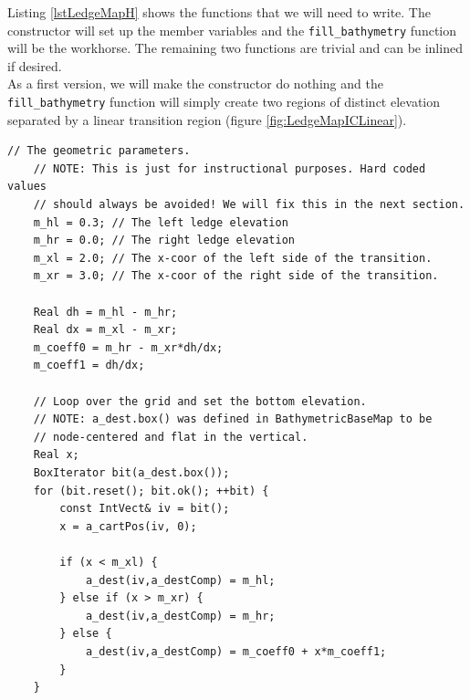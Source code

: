 \documentclass[12pt]{article}
\begin{document}
Listing \ref{lstLedgeMapH} shows the functions that we will need to write. The constructor will set up the member variables and the \texttt{fill\_bathymetry} function will be the workhorse. The remaining two functions are trivial and can be inlined if desired.\\

As a first version, we will make the constructor do nothing and the \texttt{fill\_bathymetry} function will simply create two regions of distinct elevation separated by a linear transition region (figure \ref{fig:LedgeMapICLinear}).

\begin{lstlisting}[caption={Our first version of the \texttt{fill\_bathymetry} function. This will provide a linear transition region. All geometric parameters are hard-coded.},float=h]
	// The geometric parameters.
	// NOTE: This is just for instructional purposes. Hard coded values
	// should always be avoided! We will fix this in the next section.
	m_hl = 0.3; // The left ledge elevation
	m_hr = 0.0; // The right ledge elevation
    m_xl = 2.0; // The x-coor of the left side of the transition.
    m_xr = 3.0; // The x-coor of the right side of the transition.

    Real dh = m_hl - m_hr;
    Real dx = m_xl - m_xr;
	m_coeff0 = m_hr - m_xr*dh/dx;
	m_coeff1 = dh/dx;

	// Loop over the grid and set the bottom elevation.
	// NOTE: a_dest.box() was defined in BathymetricBaseMap to be
	// node-centered and flat in the vertical.
    Real x;
    BoxIterator bit(a_dest.box());
	for (bit.reset(); bit.ok(); ++bit) {
		const IntVect& iv = bit();
		x = a_cartPos(iv, 0);

		if (x < m_xl) {
			a_dest(iv,a_destComp) = m_hl;
		} else if (x > m_xr) {
			a_dest(iv,a_destComp) = m_hr;
		} else {
			a_dest(iv,a_destComp) = m_coeff0 + x*m_coeff1;
		}
	}
\end{lstlisting}
\end{document}

